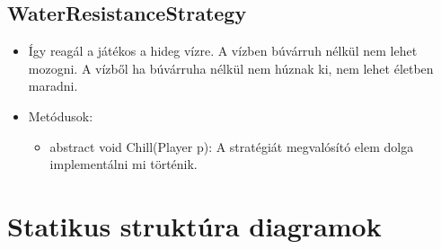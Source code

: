 \subsection{WaterResistanceStrategy}
\begin{itemize}
	\item Így reagál a játékos a hideg vízre. A vízben búvárruh nélkül nem lehet mozogni. A vízből ha búvárruha nélkül nem húznak ki, nem lehet életben maradni.
	\item Metódusok:
	\begin{itemize}
		\item abstract void Chill(Player p): A stratégiát megvalósító elem dolga implementálni mi történik.
	\end{itemize}
\end{itemize}

\section{Statikus struktúra diagramok}

